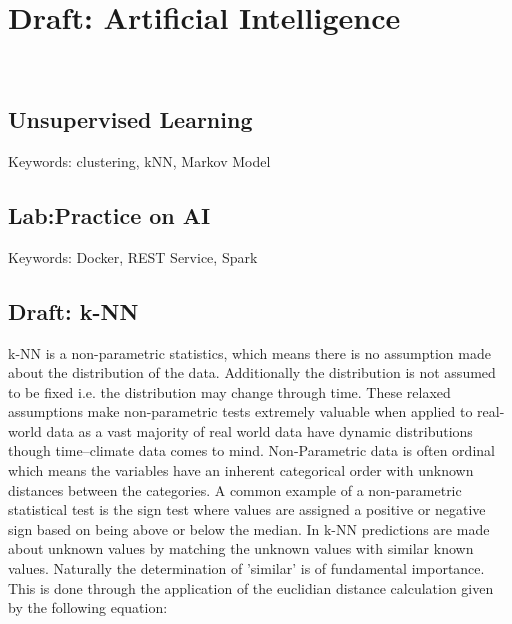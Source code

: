 \chapter{Draft: Artificial Intelligence}
\label{c:ai}

\FILENAME\

%
%

\section{Unsupervised Learning}

Keywords: clustering, kNN, Markov Model




\section{Lab:Practice on AI}
Keywords: Docker, REST Service, Spark


\section{Draft: k-NN}

k-NN is a non-parametric statistics, which means there is no
assumption made about the distribution of the data. Additionally the
distribution is not assumed to be fixed i.e. the distribution may
change through time. These relaxed assumptions make non-parametric
tests extremely valuable when applied to real-world data as a vast
majority of real world data have dynamic distributions though
time--climate data comes to mind. Non-Parametric data is often ordinal
which means the variables have an inherent categorical order with
unknown distances between the categories. A common example of a
non-parametric statistical test is the sign test where values are
assigned a positive or negative sign based on being above or below the
median. In k-NN predictions are made about unknown values by matching
the unknown values with similar known values. Naturally the
determination of 'similar' is of fundamental importance. This is done
through the application of the euclidian distance calculation given by
the following equation: 


